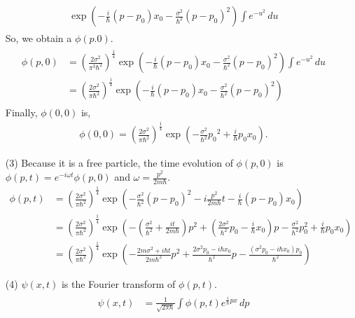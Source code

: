 \documentclass[floatfix,nofootinbib,superscriptaddress,fleqn]{revtex4-2}
\begin{document}
\begin{itemize}
\begin{align*}
\begin{split}
      \exp\left( -\frac{i}{\hbar}(p-p_0)x_0
      -\frac{\sigma^2}{\hbar^2}(p-p_0)^2 \right)
      \int e^{-u^2}\,du
    \end{split}
  \end{align*}
  So, we obtain a $\phi(p.0)$.
  \begin{align*}
    \begin{split}
      \phi(p,0) &= {\left(\frac{2\sigma^2}{\pi^3\hbar^2}\right)}
      ^{\frac{1}{4}}
      \exp\left( -\frac{i}{\hbar}(p-p_0)x_0
      -\frac{\sigma^2}{\hbar^2}(p-p_0)^2 \right)
      \int e^{-u^2}\,du \\
      &= {\left(\frac{2\sigma^2}{\pi\hbar^2}\right)}^{\frac{1}{4}}
      \exp\left( -\frac{i}{\hbar}(p-p_0)x_0
      -\frac{\sigma^2}{\hbar^2}(p-p_0)^2 \right)
    \end{split}
  \end{align*}
  Finally, $\phi(0,0)$ is,
  \begin{align}
    \phi(0,0) = {\left(\frac{2\sigma^2}{\pi\hbar^2}\right)}^{\frac{1}{4}}
    \exp\left(-\frac{\sigma^2}{\hbar^2}{p_0}^2+\frac{i}{\hbar}p_0x_0\right).
  \end{align}
  \item[(3)]Because it is a free particle, the time evolution of 
  $\phi(p,0)$ is $\phi(p,t)=e^{-i\omega t}\phi(p,0)$ 
  and $\omega = \frac{p^2}{2m\hbar}$.
  \begin{align*}
      \phi(p,t) &={\left(\frac{2\sigma^2}{\pi\hbar^2}\right)}^{\frac{1}{4}}
      \exp\left(-\frac{\sigma^2}{\hbar^2}(p-p_0)^2-i\frac{p^2}{2m\hbar}t
      -\frac{i}{\hbar}(p-p_0)x_0 \right) \\
      &={\left(\frac{2\sigma^2}{\pi\hbar^2}\right)}^{\frac{1}{4}}
      \exp\left(-\left(\frac{\sigma^2}{\hbar^2} 
      +\frac{it}{2m\hbar}\right)p^2 
      +\left(\frac{2\sigma^2}{\hbar^2}p_0-\frac{i}{\hbar}x_0\right)p 
      -\frac{\sigma^2}{\hbar^2}p_0^2+\frac{i}{\hbar}p_0x_0 \right) \\ 
      &={\left(\frac{2\sigma^2}{\pi\hbar^2}\right)}^{\frac{1}{4}}
      \exp\left(-\frac{2m\sigma^2+i\hbar t}{2m\hbar^2}p^2 
      +\frac{2\sigma^2p_0-i\hbar x_0}{\hbar^2}p
      -\frac{\left(\sigma^2p_0-i\hbar x_0\right)p_0}{\hbar^2} \right)
  \end{align*}
  \item[(4)] $\psi(x,t)$ is the Fourier transform of $\phi(p,t)$.
  \begin{align}
    \begin{split}
      \psi(x,t) &= \frac{1}{\sqrt{2\pi\hbar}}
      \int\phi(p,t)e^{\frac{i}{\hbar}px}\,dp  \\

\end{split}
\end{align}
\end{itemize}
\end{document}
